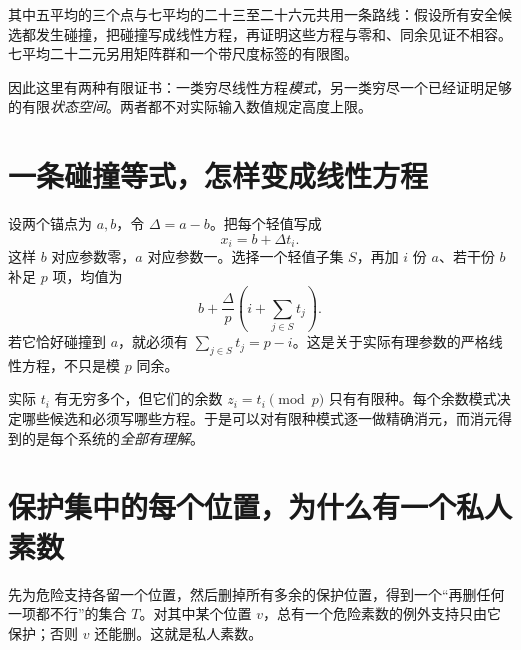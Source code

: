 \documentclass[11pt,a4paper,oneside,openany]{book}
\theoremstyle{definition}
\numberwithin{equation}{chapter}
\begin{document}
其中五平均的三个点与七平均的二十三至二十六元共用一条路线：假设所有安全候选都发生碰撞，把碰撞写成线性方程，再证明这些方程与零和、同余见证不相容。七平均二十二元另用矩阵群和一个带尺度标签的有限图。

因此这里有两种有限证书：一类穷尽线性方程\emph{模式}，另一类穷尽一个已经证明足够的有限\emph{状态空间}。两者都不对实际输入数值规定高度上限。

\section{一条碰撞等式，怎样变成线性方程}
设两个锚点为 $a,b$，令 $\Delta=a-b$。把每个轻值写成
\[x_i=b+\Delta t_i.
\]
这样 $b$ 对应参数零，$a$ 对应参数一。选择一个轻值子集 $S$，再加 $i$ 份 $a$、若干份 $b$ 补足 $p$ 项，均值为
\[b+\frac{\Delta}{p}\left(i+\sum_{j\in S}t_j\right).
\]
若它恰好碰撞到 $a$，就必须有 $\sum_{j\in S}t_j=p-i$。这是关于实际有理参数的严格线性方程，不只是模 $p$ 同余。

实际 $t_i$ 有无穷多个，但它们的余数 $z_i=t_i\pmod p$ 只有有限种。每个余数模式决定哪些候选和必须写哪些方程。于是可以对有限种模式逐一做精确消元，而消元得到的是每个系统的\emph{全部有理解}。

\section{保护集中的每个位置，为什么有一个私人素数}
先为危险支持各留一个位置，然后删掉所有多余的保护位置，得到一个“再删任何一项都不行”的集合 $T$。对其中某个位置 $v$，总有一个危险素数的例外支持只由它保护；否则 $v$ 还能删。这就是私人素数。
\end{document}
